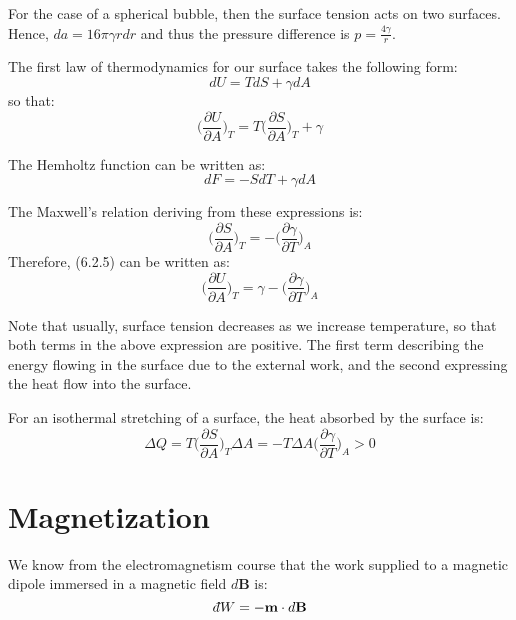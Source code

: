 \documentclass[a4paper,11pt,oneside]{book}
\newcommand{\dbar}{d\hspace*{-0.08em}\bar{}\hspace*{0.1em}}
\begin{document}
For the case of a spherical bubble, then the surface tension acts on two surfaces. Hence, $da = 16 \pi \gamma r dr$ and thus the pressure difference is $p=\frac{4 \gamma}{r}$. 


The first law of thermodynamics for our surface takes the following form:
\begin{equation}
    dU = TdS + \gamma dA
\end{equation}
so that:
\begin{equation}
     \bigg(\frac{\partial U}{\partial A}\bigg)_T =  T\bigg(\frac{\partial S}{\partial A}\bigg)_T + \gamma
\end{equation}

The Hemholtz function can be written as:
\begin{equation}
    dF = -SdT + \gamma dA
\end{equation}

The Maxwell's relation deriving from these expressions is:
\begin{equation}
    \bigg(\frac{\partial S}{\partial A}\bigg)_T = -  \bigg(\frac{\partial \gamma}{\partial T}\bigg)_A
\end{equation}
Therefore, (6.2.5) can be written as:
\begin{equation}
    \bigg(\frac{\partial U}{\partial A}\bigg)_T =  \gamma-  \bigg(\frac{\partial \gamma}{\partial T}\bigg)_A
\end{equation}

Note that usually, surface tension decreases as we increase temperature, so that both terms in the above expression are positive. The first term describing the energy flowing in the surface due to the external work, and the second expressing the heat flow into the surface. 

For an isothermal stretching of a surface, the heat absorbed by the surface is:
\begin{equation}
    \Delta Q = T  \bigg(\frac{\partial S}{\partial A}\bigg)_T \Delta A = - T \Delta A  \bigg(\frac{\partial \gamma}{\partial T}\bigg)_A >0
\end{equation}
\section{Magnetization}
We know from the electromagnetism course that the work supplied to a magnetic dipole immersed in a magnetic field $d\textbf{B}$ is:
\begin{equation}
    \dbar W = - \textbf{m} \cdot d\textbf{B}
\end{equation}
\end{document}
